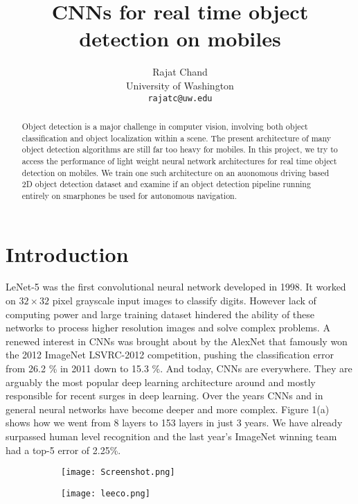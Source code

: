 \documentclass{article}
\title{CNNs for real time object detection on mobiles}
\author{
  Rajat Chand\\
  University of Washington\\
  \texttt{rajatc@uw.edu} \\
}
\begin{document}
\maketitle

\begin{abstract}
Object detection is a major challenge in computer
vision, involving both object classification and object localization
within a scene. The present architecture of many object detection algorithms are still far too heavy for mobiles. In this project, we try to access the performance of light weight neural network architectures for real time object detection on mobiles. We train one such architecture on an auonomous driving based 2D object detection dataset and examine if an object detection pipeline running entirely on smarphones be used for autonomous navigation. 
\end{abstract}

\section{Introduction}

LeNet-5 \cite{lecun2015lenet} was the first convolutional neural network developed in 1998. It worked on $32\times 32$ pixel grayscale input images to classify digits. However lack of computing power and large training dataset hindered the ability of these networks to process higher resolution images and solve complex problems. A renewed interest in CNNs was brought about by the AlexNet \cite{krizhevsky2012imagenet} that famously won the 2012 ImageNet LSVRC-2012 competition, pushing the classification error from 26.2 \% in 2011 down to 15.3 \%. And today, CNNs are everywhere. They are arguably the most popular deep learning architecture around and mostly responsible for recent surges in deep learning. Over the years CNNs and in general neural networks have become deeper and more complex. Figure 1(a) shows how we went from 8 layers to 153 layers in just 3 years. We have already surpassed human level recognition and the last year's ImageNet winning team had a top-5 error of 2.25\%.

\begin{figure}[H]
	\centering
	\begin{subfigure}[b]{0.475\textwidth}
		\centering
		\texttt{[image: Screenshot.png]}
	\end{subfigure}
	\begin{subfigure}[b]{0.475\textwidth}
		\centering
		\texttt{[image: leeco.png]}
	\end{subfigure}
	\caption{}
\end{figure}
\end{document}

